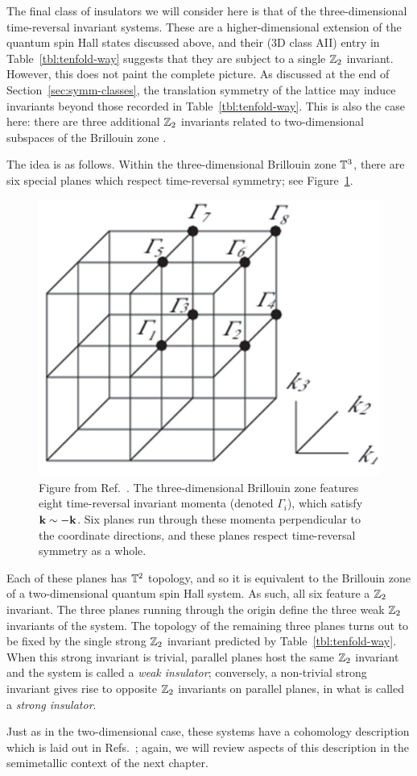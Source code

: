 The final class of insulators we will consider here is that of the three-dimensional time-reversal invariant systems. These are a higher-dimensional extension of the quantum spin Hall states discussed above, and their (3D class AII) entry in Table~\ref{tbl:tenfold-way} suggests that they are subject to a single $\mathbb{Z}_2$ invariant. However, this does not paint the complete picture. As discussed at the end of Section~\ref{sec:symm-classes}, the translation symmetry of the lattice may induce invariants beyond those recorded in Table~\ref{tbl:tenfold-way}. This is also the case here: there are three additional $\mathbb{Z}_2$ invariants related to two-dimensional subspaces of the Brillouin zone \cite{MooreBalents_TRS}.

The idea is as follows. Within the three-dimensional Brillouin zone $\mathbb{T}^3$, there are six special planes which respect time-reversal symmetry; see Figure~\ref{fig:TRIM_3D}.
\begin{figure}[htb!]
	\centering
	\includegraphics[width=.5\linewidth]{Images/TRIM_3D}
	\caption{Figure from Ref.~\cite{Sato_superconductors}. The three-dimensional Brillouin zone features eight time-reversal invariant momenta (denoted $\Gamma_i$), which satisfy $\vb{k}\sim-\vb{k}$. Six planes run through these momenta perpendicular to the coordinate directions, and these planes respect time-reversal symmetry as a whole.}
	\label{fig:TRIM_3D}
\end{figure}
Each of these planes has $\mathbb{T}^2$ topology, and so it is equivalent to the Brillouin zone of a two-dimensional quantum spin Hall system. As such, all six feature a $\mathbb{Z}_2$ invariant. The three planes running through the origin define the three weak $\mathbb{Z}_2$ invariants of the system. The topology of the remaining three planes turns out to be fixed by the single strong $\mathbb{Z}_2$ invariant predicted by Table~\ref{tbl:tenfold-way}. When this strong invariant is trivial, parallel planes host the same $\mathbb{Z}_2$ invariant and the system is called a \emph{weak insulator}; conversely, a non-trivial strong invariant gives rise to opposite $\mathbb{Z}_2$ invariants on parallel planes, in what is called a \emph{strong insulator}.

Just as in the two-dimensional case, these systems have a cohomology description which is laid out in Refs.~\cite{NittisGomi_FKMM,BunkSzabo_TRS}; again, we will review aspects of this description in the semimetallic context of the next chapter.